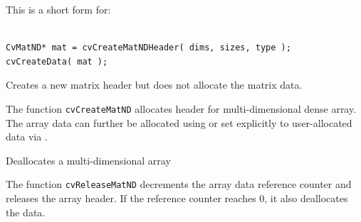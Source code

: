 \begin{description}
\end{description}

This is a short form for:

\begin{lstlisting}

CvMatND* mat = cvCreateMatNDHeader( dims, sizes, type );
cvCreateData( mat );

\end{lstlisting}

\label{CreateMatNDHeader}

Creates a new matrix header but does not allocate the matrix data.


\begin{description}
\end{description}

The function \texttt{cvCreateMatND} allocates header for multi-dimensional dense array. The array data can further be allocated using  or set explicitly to user-allocated data via .

\label{ReleaseMatND}

Deallocates a multi-dimensional array


\begin{description}
\end{description}

The function \texttt{cvReleaseMatND} decrements the array data reference counter and releases the array header. If the reference counter reaches 0, it also deallocates the data.

